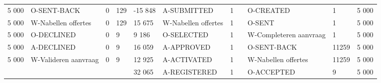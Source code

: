 \begin{tabular}{lllllllllll}
5 000 & O-SENT-BACK & 0 & 129 & -15 848 & A-SUBMITTED & 1 &  & O-CREATED & 1 & 5 000 \\
5 000 & W-Nabellen offertes & 0 & 129 & 15 675 & W-Nabellen offertes & 1 &  & O-SENT & 1 & 5 000 \\
5 000 & O-DECLINED & 0 & 9 & 9 186 & O-SELECTED & 1 &  & W-Completeren aanvraag & 1 & 5 000 \\
5 000 & A-DECLINED & 0 & 9 & 16 059 & A-APPROVED & 1 &  & O-SENT-BACK & 11259 & 5 000 \\
5 000 & W-Valideren aanvraag & 0 & 9 & 12 925 & A-ACTIVATED & 1 &  & W-Nabellen offertes & 11259 & 5 000 \\
 &  &  &  & 32 065 & A-REGISTERED & 1 &  & O-ACCEPTED & 9 & 5 000 \\
\bottomrule
\end{tabular}
